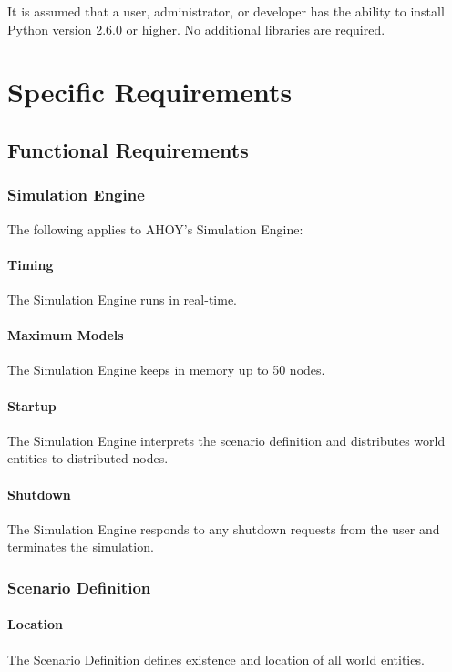 \documentclass[titlepage]{article}
\begin{document}
It is assumed that a user, administrator, or developer has the ability to install Python version 2.6.0 or higher.  No additional libraries are required.


\section{Specific Requirements%
  \label{specific-requirements}%
}

\subsection{Functional Requirements%
    \label{functional}%
}

\subsubsection{Simulation Engine}
	The following applies to AHOY's Simulation Engine:
    \checkbox \paragraph{Timing} The Simulation Engine runs in real-time.
    \checkbox \paragraph{Maximum Models} The Simulation Engine keeps in memory up to 50 nodes.
    \checkbox \paragraph{Startup} The Simulation Engine interprets the scenario definition and distributes world entities to distributed nodes.
    \checkbox \paragraph{Shutdown} The Simulation Engine responds to any shutdown requests from the user and terminates the simulation.

\subsubsection{Scenario Definition}
	\paragraph{Location} The Scenario Definition defines existence and location of all world entities.
\end{document}
